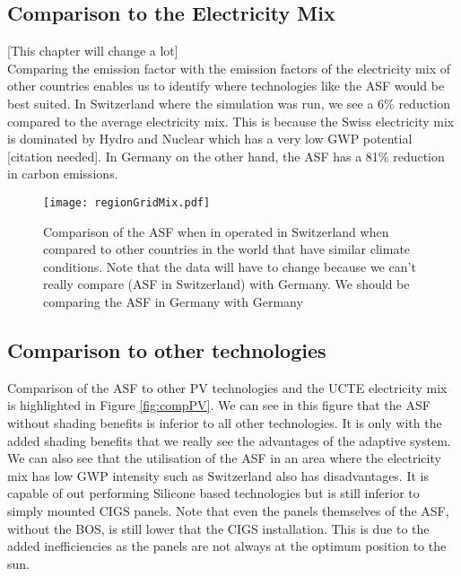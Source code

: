 
\subsection{Comparison to the Electricity Mix}
\label{ch:elecMix}
[This chapter will change a lot]\\

Comparing the emission factor with the emission factors of the electricity mix of other countries enables us to identify where technologies like the ASF would be best suited. In Switzerland where the simulation was run, we see a 6\% reduction compared to the average electricity mix. This is because the Swiss electricity mix is dominated by Hydro and Nuclear which has a very low GWP potential [citation needed]. In Germany on the other hand, the ASF has a 81\% reduction in carbon emissions. \\

\begin{figure}[H]
\begin{center}
\texttt{[image: regionGridMix.pdf]}
\caption{Comparison of the ASF when in operated in Switzerland when compared to other countries in the world that have similar climate conditions. Note that the data will have to change because we can't really compare (ASF in Switzerland) with Germany. We should be comparing the ASF in Germany with Germany}
\label{fig:compReg}
\end{center}
\end{figure}


\subsection{Comparison to other technologies}

Comparison of the ASF to other PV technologies and the UCTE electricity mix is highlighted in Figure \ref{fig:compPV}. We can see in this figure that the ASF without shading benefits is inferior to all other technologies. It is only with the added shading benefits that we really see the advantages of the adaptive system.
We can also see that the utilisation of the ASF in an area where the electricity mix has low GWP intensity such as Switzerland also has disadvantages. It is capable of out performing Silicone based technologies but is still inferior to simply mounted CIGS panels. Note that even the panels themselves of the ASF, without the BOS, is still lower that the CIGS installation. This is due to the added inefficiencies as the panels are not always at the optimum position to the sun.



